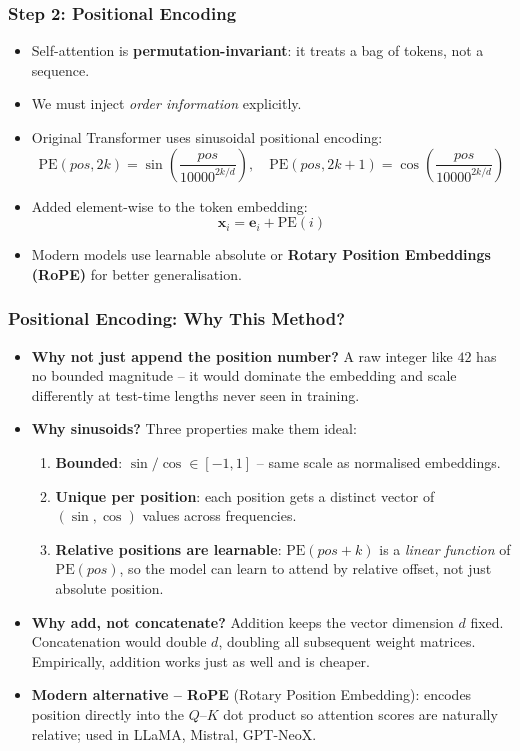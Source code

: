 \begin{frame}[fragile]\frametitle{Step 2: Positional Encoding}
\begin{itemize}
\item Self-attention is \textbf{permutation-invariant}: it treats a bag of tokens, not a sequence.
\item We must inject \emph{order information} explicitly.
\item Original Transformer uses sinusoidal positional encoding:
\[
  \text{PE}(pos, 2k)   = \sin\!\left(\frac{pos}{10000^{2k/d}}\right), \quad
  \text{PE}(pos, 2k+1) = \cos\!\left(\frac{pos}{10000^{2k/d}}\right)
\]
\item Added element-wise to the token embedding:
\[
  \mathbf{x}_i = \mathbf{e}_i + \text{PE}(i)
\]
\item Modern models use learnable absolute or \textbf{Rotary Position Embeddings (RoPE)} for better generalisation.
\end{itemize}
\end{frame}

\begin{frame}[fragile]\frametitle{Positional Encoding: Why This Method?}
\begin{itemize}
\item \textbf{Why not just append the position number?}
  A raw integer like $42$ has no bounded magnitude – it would dominate the embedding
  and scale differently at test-time lengths never seen in training.
\item \textbf{Why sinusoids?} Three properties make them ideal:
  \begin{enumerate}
  \item \textbf{Bounded}: $\sin/\cos \in [-1, 1]$ – same scale as normalised embeddings.
  \item \textbf{Unique per position}: each position gets a distinct vector of
        $(\sin, \cos)$ values across frequencies.
  \item \textbf{Relative positions are learnable}: $\text{PE}(pos+k)$ is a
        \emph{linear function} of $\text{PE}(pos)$, so the model can learn
        to attend by relative offset, not just absolute position.
  \end{enumerate}
\item \textbf{Why add, not concatenate?}
  Addition keeps the vector dimension $d$ fixed.
  Concatenation would double $d$, doubling all subsequent weight matrices.
  Empirically, addition works just as well and is cheaper.
\item \textbf{Modern alternative – RoPE} (Rotary Position Embedding):
  encodes position directly into the $Q$–$K$ dot product so attention scores
  are naturally relative; used in LLaMA, Mistral, GPT-NeoX.
\end{itemize}
\end{frame}

